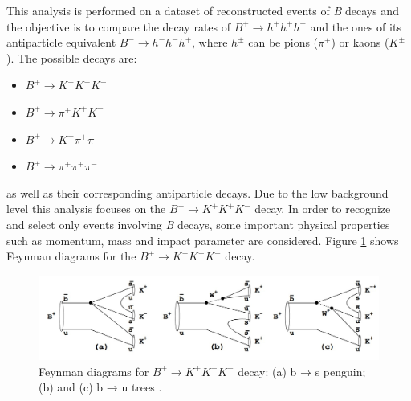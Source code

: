 This analysis is performed on a dataset of reconstructed events of \textit{B} decays and the objective
is to compare the decay rates of 
$B^{+} \to h^{+}h^{+}h^{-}$
and the ones of its antiparticle equivalent
$B^{-} \to h^{-}h^{-}h^{+}$, where $h^{\pm}$ can be pions ($\pi^{\pm}$) or kaons ($K^{\pm}$). The possible decays are:
\begin{itemize}
    \item $B^{+} \to K^{+}K^{+}K^{-}$
    \item $B^{+} \to \pi^{+}K^{+}K^{-}$
    \item $B^{+} \to K^{+}\pi^{+}\pi^{-}$
    \item $B^{+} \to \pi^{+}\pi^{+}\pi^{-}$
\end{itemize}
as well as their corresponding antiparticle decays. Due to the low background level this
analysis focuses on the $B^{+} \to K^{+}K^{+}K^{-}$ decay. In order to recognize and select only events
involving \textit{B} decays, some important physical properties such as momentum, mass and impact parameter are considered. Figure \ref{feynman} shows Feynman diagrams for the $B^{+} \to K^{+}K^{+}K^{-}$ decay.

\begin{figure}[H]
    \centering
    \includegraphics[width=0.8\linewidth]{Figure/1.jpg}
    \caption{Feynman diagrams for $B^{+} \to K^{+}K^{+}K^{-}$ decay: (a) b → s penguin; (b) and (c) b → u trees \cite{feynman}.}
    \label{feynman}
\end{figure}